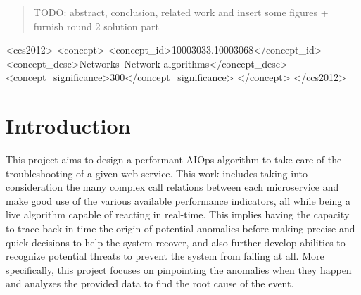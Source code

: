 \documentclass[acmsmall, screen, nonacm]{acmart}
\begin{document}
\begin{abstract}
  TODO: abstract, conclusion, related work and insert some figures + furnish round 2 solution part
\end{abstract}

\begin{CCSXML}
<ccs2012>
   <concept>
       <concept_id>10003033.10003068</concept_id>
       <concept_desc>Networks~Network algorithms</concept_desc>
       <concept_significance>300</concept_significance>
       </concept>
 </ccs2012>
\end{CCSXML}




\maketitle

\section{Introduction}
This project aims to design a performant AIOps algorithm to take care of the troubleshooting of a given web service. 
This work includes taking into consideration the many complex call relations between each microservice and make good use of the various available performance indicators, all while being a live algorithm capable of reacting in real-time. 
This implies having the capacity to trace back in time the origin of potential anomalies before making precise and quick decisions to help the system recover, and also further develop abilities to recognize potential threats to prevent the system from failing at all. 
More specifically, this project focuses on pinpointing the anomalies when they happen and analyzes the provided data to find the root cause of the event. 
\end{document}
